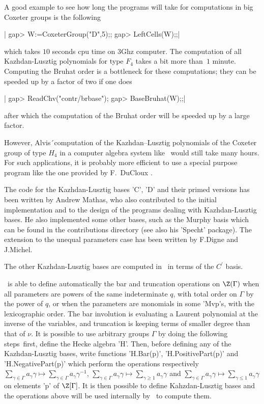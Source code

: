 A  good example to see how long  the programs will take for computations in
big Coxeter groups is the following\:

|    gap> W:=CoxeterGroup("D",5);;
    gap> LeftCells(W);;|

which  takes $10$ seconds cpu time on 3Ghz computer. The computation of all
Kazhdan-Lusztig  polynomials  for  type  $F_4$  takes  a  bit more than~$1$
minute.  Computing the Bruhat order is a bottleneck for these computations;
they can be speeded up by a factor of two if one does\:

|    gap> ReadChv("contr/brbase");
    gap> BaseBruhat(W);;|

after  which the computation  of the Bruhat  order will be  speeded up by a
large factor.

However,  Alvis\'\ computation  of the  Kazhdan--Lusztig polynomials of the
Coxeter  group of type $H_4$ in a  computer algebra system like \GAP\ would
still take many hours. For such applications, it is probably more efficient
to  use a  special purpose  program like  the one  provided by  F.\ DuCloux
\cite{DuC91}.

The  code for the Kazhdan-Lusztig bases  'C', 'D' and their primed versions
has  been written  by Andrew  Mathas, who  also contributed  to the initial
implementation   and   to   the   design   of  the  programs  dealing  with
Kazhdan-Lusztig  bases. He also  implemented some other  bases, such as the
Murphy  basis which can  be found in  the contributions directory (see also
his  'Specht' package).  The extension  to the  unequal parameters case has
been written by F.Digne and J.Michel.

The  other Kazhdan-Lusztig bases  are computed in  \CHEVIE\ in terms of the
$C^\prime$ basis.

\CHEVIE\  is able to define automatically the bar and truncation operations
on  $\Z(\Gamma)$ when all  parameters are powers  of the same indeterminate
$q$,  with  total  order  on  $\Gamma$  by  the  power  of $q$, or when the
parameters  are monomials in some 'Mvp's, with the lexicographic order. The
bar  involution is  evaluating a  Laurent polynomial  at the inverse of the
variables,  and truncation is keeping terms  of smaller degree than that of
$\nu$.  It  is  possible  to  use  arbitrary  groups  $\Gamma$ by doing the
following  steps\:\  first,  define  the  Hecke  algebra  'H'. Then, before
defining  any  of  the  Kazhdan-Lusztig  bases, write functions 'H.Bar(p)',
'H.PositivePart(p)'  and 'H.NegativePart(p)'  which perform  the operations
respectively $\sum_{\gamma\in\Gamma} a_\gamma\gamma\mapsto
\sum_{\gamma\in\Gamma}     a_\gamma\gamma^{-1}$,    $\sum_{\gamma\in\Gamma}
a_\gamma\gamma\mapsto     \sum_{\gamma\ge     1}     a_\gamma\gamma$    and
$\sum_{\gamma\in\Gamma}     a_\gamma\gamma\mapsto     \sum_{\gamma\le    1}
a_\gamma\gamma$  on elements  'p' of  $\Z[\Gamma]$. It  is then possible to
define  Kahzdan-Lusztig  bases  and  the  operations  above  will  be  used
internally by \CHEVIE\ to compute them.

